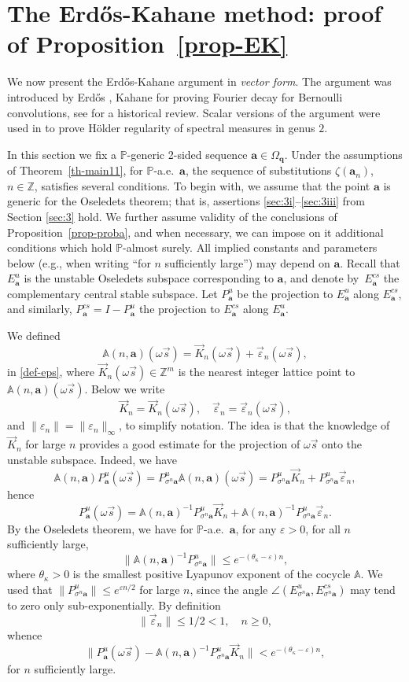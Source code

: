 \documentclass[11pt]{article}
\newcommand{\eg}{e.g.,\xspace}
\numberwithin{equation}{section}\newcommand{\Relation}[2][]{}\newtheorem*{prop*}{Proposition}
\let\epsilon\varepsilon
\theoremstyle{plain}
\theoremstyle{definition}
\newcommand\bom{{\boldsymbol a}}\let\ba\bom
\newcommand\bq{{\boldsymbol q}}
\let\eps\varepsilon
\let\om\omega
\let\Om\Omega
\let\sig\sigma
\newcommand\Aa{\mathbb{A}}
\newcommand{\Z}{\mathbb{Z}}
\renewcommand{\P}{\mathbb{P}}
\newcommand\be{\begin{equation}}
\newcommand\ee{\end{equation}}
\begin{document}
\section{The Erd\H{o}s-Kahane method: proof of Proposition~\ref{prop-EK} }

We now present the Erd\H{o}s-Kahane argument in {\it vector form}. The argument was introduced by Erd\H{o}s \cite{Erd} , Kahane \cite{Kahane} for proving Fourier decay for Bernoulli convolutions, see \cite{sixty} for a historical review. Scalar versions of the argument were used in \cite{BuSol2,BuSo18a} to prove Hölder regularity of spectral measures in genus $2$.

In this section we fix a $\P$-generic 2-sided sequence $\bom\in \Om_\bq$.
Under the assumptions of Theorem~\ref{th-main11}, for $\P$-a.e.\ $\bom$, the sequence of substitutions $\zeta(\bom_n)$,
$n\in \Z$, satisfies several conditions.
To begin with, we assume that the point $\bom$ is generic for the Oseledets theorem; that is, assertions \eqref{sec:3i}--\eqref{sec:3iii} from Section \ref{sec:3} hold. We further assume validity of the conclusions
of Proposition~\ref{prop-proba}, and when necessary, we can impose on it additional conditions which hold $\P$-almost surely.
All implied constants and parameters below (\eg when writing ``for $n$ sufficiently large'') may depend on $\bom$.
Recall that $E^u_\bom$ is the unstable Oseledets subspace corresponding to $\bom$, and denote by~$E^{cs}_\bom$ the complementary central stable subspace. Let $P^u_\bom$ be the
projection to $E^u_\bom$ along $E^{cs}_\bom$, and similarly, $P^{cs}_\bom = I - P^u_\bom$ the projection to $E^{cs}_\bom$ along $E^u_\bom$.

We defined
\[
\Aa(n,\bom) (\om\vec s) = \vec{K}_n(\om\vec s) + \vec{\eps}_n(\om\vec s),
\]
in \eqref{def-eps}, where $\vec K_n(\om\vec s)\in \Z^m$ is the nearest integer lattice point to $\Aa(n,\bom) (\om\vec s)$. Below we write
\[
\vec K_n = \vec{K}_n(\om\vec s),\quad \vec\eps_n = \vec{\eps}_n(\om\vec s),
\]
and $\|\eps_n\| = \|\eps_n\|_\infty$,
to simplify notation.
The idea is that the knowledge of $\vec K_n$ for large $n$ provides a good estimate for the projection of $\om\vec s$ onto the unstable subspace. Indeed, we have
\[
\Aa(n,\bom) P_\bom^u(\om\vec s)=P_{\sig^n\bom}^u \Aa(n,\bom) (\om\vec s)= P_{\sig^n\bom}^u \vec{K}_n + P_{\sig^n\bom}^u \vec{\eps}_n,
\]
hence
\[
P^u_\bom(\om\vec s) = \Aa(n,\bom)^{-1} P_{\sig^n\bom}^u \vec{K}_n + \Aa(n,\bom)^{-1} P_{\sig^n\bom}^u \vec{\eps}_n.
\]
By the Oseledets theorem, we have for $\P$-a.e.\ $\bom$, for any $\epsilon>0$, for all $n$ sufficiently large,
\[
\|\Aa(n,\bom)^{-1}P^u_{\sig^n\bom}\|\le e^{-(\theta_\kappa-\epsilon)n},
\]
where $\theta_\kappa>0$ is the smallest positive Lyapunov exponent of the cocycle $\Aa$.
We used that $\|P^u_{\sig^n\bom}\|\le e^{\eps n/2}$ for large $n$, since the angle $\angle(E^u_{\sig^n\bom}, E^{cs}_{\sig^n\bom})$ may tend to zero only sub-exponentially.
By definition
\be \label{up1}
\|\vec{\eps}_n\|\le 1/2<1,\quad n\ge 0,
\ee
whence
\be \label{good-est}
\|P^u_\bom(\om\vec s) -\Aa(n,\bom)^{-1} P_{\sig^n\bom}^u \vec{K}_n\| < e^{-(\theta_\kappa-\epsilon)n},
\ee
for $n$ sufficiently large.
\end{document}
